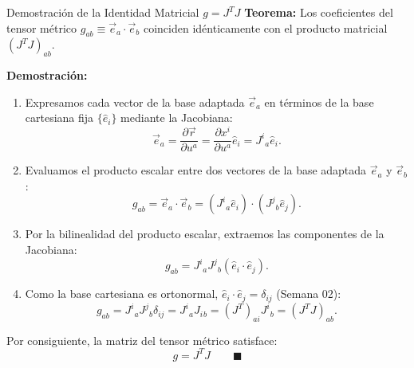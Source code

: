 \documentclass[10pt,aspectratio=169]{beamer}
\begin{document}
\begin{frame}{Demostración de la Identidad Matricial $g = J^T J$}
  \footnotesize
  \textbf{Teorema:} Los coeficientes del tensor métrico $g_{ab} \equiv \vec{e}_a \cdot \vec{e}_b$ coinciden idénticamente con el producto matricial $(J^T J)_{ab}$.

  \vspace{0.2cm}
  \textbf{Demostración:}
  \begin{enumerate}\itemsep4pt
    \item Expresamos cada vector de la base adaptada $\vec{e}_a$ en términos de la base cartesiana fija $\{\hat{e}_i\}$ mediante la Jacobiana:
    \[
    \vec{e}_a = \frac{\partial\vec{r}}{\partial u^a} = \frac{\partial x^i}{\partial u^a}\hat{e}_i = J^i{}_a \hat{e}_i.
    \]
    \item Evaluamos el producto escalar entre dos vectores de la base adaptada $\vec{e}_a$ y $\vec{e}_b$:
    \[
    g_{ab} = \vec{e}_a \cdot \vec{e}_b = (J^i{}_a \hat{e}_i) \cdot (J^j{}_b \hat{e}_j).
    \]
    \item Por la bilinealidad del producto escalar, extraemos las componentes de la Jacobiana:
    \[
    g_{ab} = J^i{}_a J^j{}_b (\hat{e}_i \cdot \hat{e}_j).
    \]
    \item Como la base cartesiana es ortonormal, $\hat{e}_i \cdot \hat{e}_j = \delta_{ij}$ (Semana 02):
    \[
    g_{ab} = J^i{}_a J^j{}_b \delta_{ij} = J^i{}_a J_i{}_b = (J^T)_{ai} J^i{}_b = (J^T J)_{ab}.
    \]
  \end{enumerate}
  Por consiguiente, la matriz del tensor métrico satisface:
  \[
  \boxed{g = J^T J} \qquad \blacksquare
  \]
\end{frame}
\end{document}

